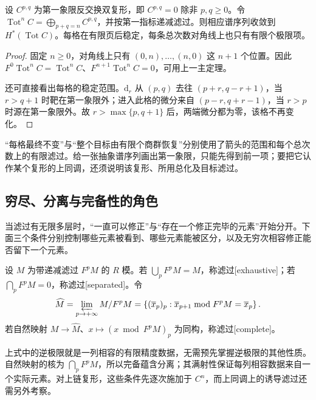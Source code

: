 \begin{corollary}\label{g2:cor:first-quadrant-convergence}
	设 \(C^{p,q}\) 为第一象限反交换双复形，即 \(C^{p,q}=0\) 除非 \(p,q\ge0\)。令 \(\operatorname{Tot}^nC=\bigoplus_{p+q=n}C^{p,q}\)，并按第一指标递减滤过。则相应谱序列收敛到 \(H^*(\operatorname{Tot}C)\)。每格在有限页后稳定，每条总次数对角线上也只有有限个极限项。
\end{corollary}
\begin{proof}
	固定 \(n\ge0\)，对角线上只有 \((0,n),\ldots,(n,0)\) 这 \(n+1\) 个位置。因此 \(F^0\operatorname{Tot}^nC=\operatorname{Tot}^nC\)、\(F^{n+1}\operatorname{Tot}^nC=0\)，可用上一主定理。

	还可直接看出每格的稳定范围。\(\mathrm d_r\) 从 \((p,q)\) 去往 \((p+r,q-r+1)\)，当 \(r>q+1\) 时靶在第一象限外；进入此格的微分来自 \((p-r,q+r-1)\)，当 \(r>p\) 时源在第一象限外。故 \(r>\max\{p,q+1\}\) 后，两端微分都为零，该格不再变化。
\end{proof}

“每格最终不变”与“整个目标由有限个商群恢复”分别使用了箭头的范围和每个总次数上的有限滤过。给一张抽象谱序列画出第一象限，只能先得到前一项；要把它认作某个复形的上同调，还须说明该复形、所用总化及目标滤过。

\subsection{穷尽、分离与完备性的角色}
\label{g2:subsec:1004:02}

当滤过有无限多层时，“一直可以修正”与“存在一个修正完毕的元素”开始分开。下面三个条件分别控制哪些元素被看到、哪些元素能被区分，以及无穷次相容修正能否留下一个元素。

\begin{definition}\label{g2:def:filtration-exhaustive-separated-complete}
	设 \(M\) 为带递减滤过 \(F^pM\) 的 \(R\) 模。若 \(\bigcup_pF^pM=M\)，称滤过[exhaustive]；若 \(\bigcap_pF^pM=0\)，称滤过[separated]。令
	\[
		\widehat M=\varprojlim_{p\to+\infty}M/F^pM
		=\left\{(\overline x_p)_p:\overline x_{p+1}\bmod F^pM=\overline x_p\right\}.
	\]
	若自然映射 \(M\to\widehat M\)、\(x\mapsto(x\bmod F^pM)_p\) 为同构，称滤过[complete]。
\end{definition}

上式中的逆极限就是一列相容的有限精度数据，无需预先掌握逆极限的其他性质。自然映射的核为 \(\bigcap_pF^pM\)，所以完备蕴含分离；其满射性保证每列相容数据来自一个实际元素。对上链复形，这些条件先逐次施加于 \(C^n\)，而上同调上的诱导滤过还需另外考察。


